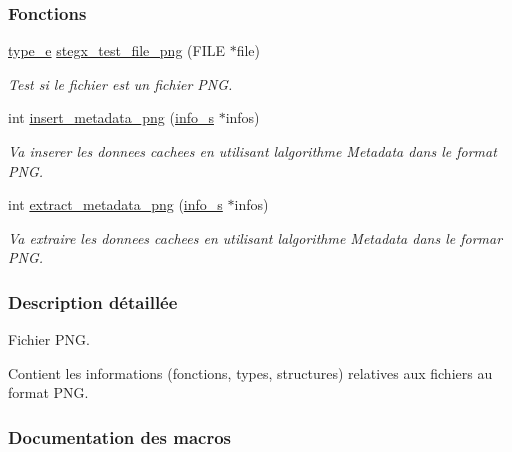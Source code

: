 \subsubsection*{Fonctions}
\begin{DoxyCompactItemize}
\item 
\hyperlink{a00047_af1ca434cca36ba9fb2a45f6cef3a16d6}{type\+\_\+e} \hyperlink{a00092_a576071ea25bd3721014ca3e596adcdfb}{stegx\+\_\+test\+\_\+file\+\_\+png} (F\+I\+LE $\ast$file)
\begin{DoxyCompactList}\small\item\em Test si le fichier est un fichier P\+NG. \end{DoxyCompactList}\item 
int \hyperlink{a00092_a2386f518ec5df78485cca31c6fe4f858}{insert\+\_\+metadata\+\_\+png} (\hyperlink{a00008_aa8ca908d92fb5bdd3c0a9e1f58b2cf03}{info\+\_\+s} $\ast$infos)
\begin{DoxyCompactList}\small\item\em Va inserer les donnees cachees en utilisant l\textquotesingle{}algorithme Metadata dans le format P\+NG. \end{DoxyCompactList}\item 
int \hyperlink{a00092_a258c2aefc0d29e112eca90e652730a84}{extract\+\_\+metadata\+\_\+png} (\hyperlink{a00008_aa8ca908d92fb5bdd3c0a9e1f58b2cf03}{info\+\_\+s} $\ast$infos)
\begin{DoxyCompactList}\small\item\em Va extraire les donnees cachees en utilisant l\textquotesingle{}algorithme Metadata dans le formar P\+NG. \end{DoxyCompactList}\end{DoxyCompactItemize}


\subsubsection{Description détaillée}
Fichier P\+NG. 

Contient les informations (fonctions, types, structures) relatives aux fichiers au format P\+NG. 

\subsubsection{Documentation des macros}
\mbox{\label{a00092_a6bbe3494feb7eb80b98ce88c9eb31134}} 
